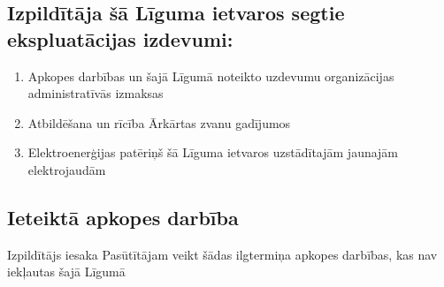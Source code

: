 \subsection{Izpildītāja šā Līguma ietvaros segtie ekspluatācijas izdevumi:}
\begin{enumerate}
	\item Apkopes darbības un šajā Līgumā noteikto uzdevumu organizācijas administratīvās izmaksas
	\item Atbildēšana un rīcība Ārkārtas zvanu gadījumos
	\item Elektroenerģijas patēriņš šā Līguma ietvaros uzstādītajām jaunajām elektrojaudām
\end{enumerate}


\subsection{Ieteiktā apkopes darbība}

Izpildītājs iesaka Pasūtītājam veikt šādas ilgtermiņa apkopes darbības, kas nav iekļautas šajā Līgumā


\begin{center}
\end{center}

